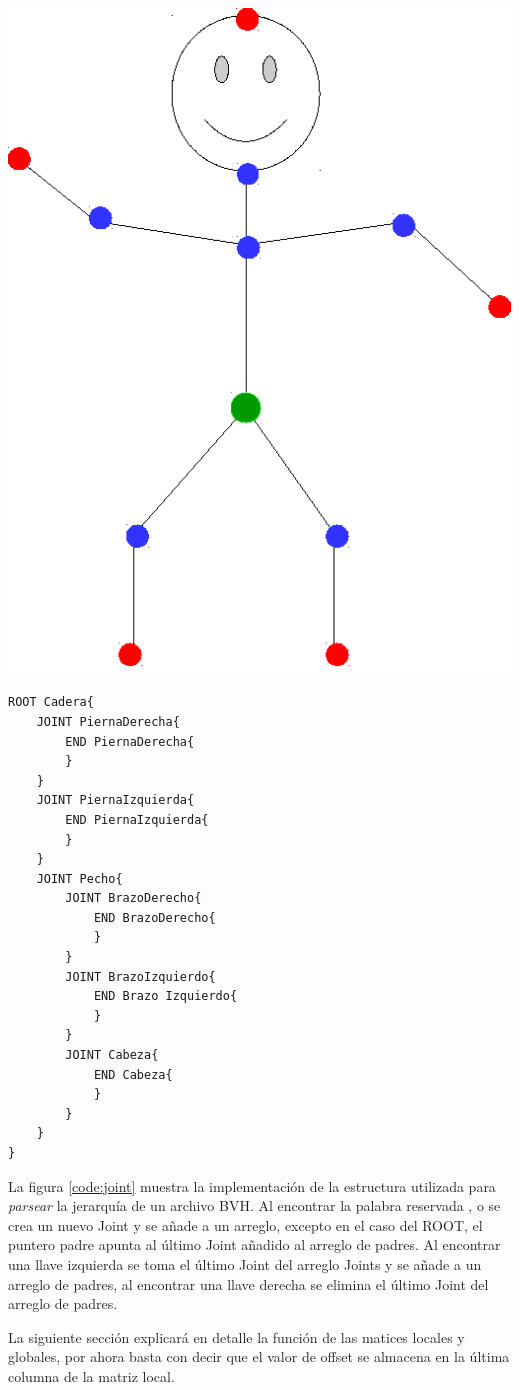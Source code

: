 \begin{minipage}{0.5\textwidth}
\centering
    \includegraphics[height = 0.70\textwidth]{imagenes/palitos}
    \label{fig:palitos}
\end{minipage}
\begin{minipage}{0.5\textwidth}
    \begin{verbatim}
ROOT Cadera{
    JOINT PiernaDerecha{
        END PiernaDerecha{
        }
    }
    JOINT PiernaIzquierda{
        END PiernaIzquierda{
        }
    }
    JOINT Pecho{
        JOINT BrazoDerecho{
            END BrazoDerecho{
            }
        }
        JOINT BrazoIzquierdo{
            END Brazo Izquierdo{
            }
        }
        JOINT Cabeza{
            END Cabeza{
            }
        }
    }
}
    \end{verbatim}    
\end{minipage}

La figura \ref{code:joint} muestra la implementación de la estructura  utilizada para \emph{parsear} la jerarquía de un archivo BVH. Al encontrar la palabra reservada ,  o  se crea un nuevo Joint y se añade a un arreglo, excepto en el caso del ROOT, el puntero padre apunta al último Joint añadido al arreglo de padres. Al encontrar una llave izquierda \mono{\{} se toma el último Joint del arreglo Joints y se añade a un arreglo de padres, al encontrar una llave derecha \mono{\}} se elimina el último Joint del arreglo de padres. 

La siguiente sección explicará en detalle la función de las matices locales y globales, por ahora basta con decir que el valor de offset se almacena en la última columna de la matriz local. 

